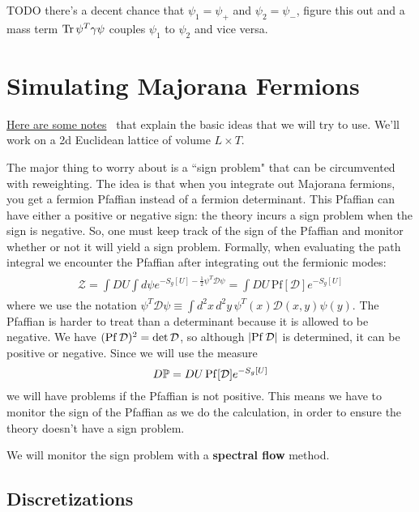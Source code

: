 {\color{red}TODO there's a decent chance that $\psi_1 = \psi_+$ and $\psi_2 = \psi_-$, figure this out}
and a mass term $\mathrm{Tr}\,\psi^T \gamma \psi$ couples $\psi_1$ to $\psi_2$ and vice versa. 

\section{Simulating Majorana Fermions}

\href{https://core.ac.uk/download/pdf/25319765.pdf}{Here are some notes}~\cite{Montvay:2001ry} that explain the basic ideas that we will try to use. We'll work on a 2d Euclidean lattice of volume $L\times T$. 

The major thing to worry about is a ``sign problem" that can be circumvented with reweighting. The idea is that when you integrate out Majorana fermions, you get a fermion Pfaffian instead of a fermion determinant. This Pfaffian can have either a positive or negative sign: the theory incurs a sign problem when the sign is negative. So, one must keep track of the sign of the Pfaffian and monitor whether or not it will yield a sign problem. Formally, when evaluating the path integral we encounter the Pfaffian after integrating out the fermionic modes:
\begin{align}\begin{split}
	\mathcal Z = \int DU \int d\psi e^{-S_g[U] - \frac{1}{2}\psi^T \mathcal D \psi} = \int DU\, \mathrm{Pf}[\mathcal D] e^{-S_g[U]}
\end{split}\end{align}
where we use the notation $\psi^T \mathcal D \psi\equiv \int d^2 x \, d^2 y \, \psi^T(x) \mathcal D(x, y) \psi(y)$. The Pfaffian is harder to treat than a determinant because it is allowed to be negative. We have $(\mathrm{Pf} \,\mathcal D)^2 = \det\mathcal D$, so although $|\mathrm{Pf}\,\mathcal D|$ is determined, it can be positive or negative. Since we will use the measure
\begin{equation}
	D\mathbb P = DU\, \mathrm{Pf} [\mathcal D] e^{-S_g[U]}
\end{equation}
we will have problems if the Pfaffian is not positive. This means we have to monitor the sign of the Pfaffian as we do the calculation, in order to ensure the theory doesn't have a sign problem. 

We will monitor the sign problem with a \textbf{spectral flow} method. 

\subsection{Discretizations}

